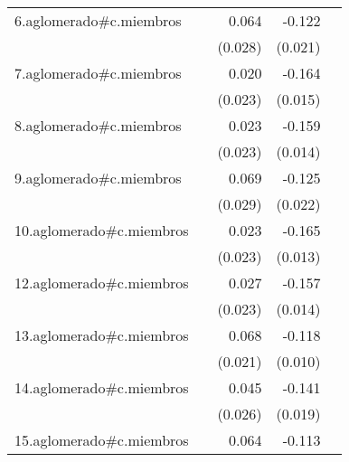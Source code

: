 {\begin{longtable}{l*{4}{D{.}{.}{-1}}}
\addlinespace
6.aglomerado#c.miembros&                     &       0.064\sym{*}  &      -0.122\sym{***}&                     \\
            &                     &     (0.028)         &     (0.021)         &                     \\
\addlinespace
7.aglomerado#c.miembros&                     &       0.020         &      -0.164\sym{***}&                     \\
            &                     &     (0.023)         &     (0.015)         &                     \\
\addlinespace
8.aglomerado#c.miembros&                     &       0.023         &      -0.159\sym{***}&                     \\
            &                     &     (0.023)         &     (0.014)         &                     \\
\addlinespace
9.aglomerado#c.miembros&                     &       0.069\sym{*}  &      -0.125\sym{***}&                     \\
            &                     &     (0.029)         &     (0.022)         &                     \\
\addlinespace
10.aglomerado#c.miembros&                     &       0.023         &      -0.165\sym{***}&                     \\
            &                     &     (0.023)         &     (0.013)         &                     \\
\addlinespace
12.aglomerado#c.miembros&                     &       0.027         &      -0.157\sym{***}&                     \\
            &                     &     (0.023)         &     (0.014)         &                     \\
\addlinespace
13.aglomerado#c.miembros&                     &       0.068\sym{**} &      -0.118\sym{***}&                     \\
            &                     &     (0.021)         &     (0.010)         &                     \\
\addlinespace
14.aglomerado#c.miembros&                     &       0.045         &      -0.141\sym{***}&                     \\
            &                     &     (0.026)         &     (0.019)         &                     \\
\addlinespace
15.aglomerado#c.miembros&                     &       0.064\sym{*}  &      -0.113\sym{***}&                     \\

\end{longtable}}
